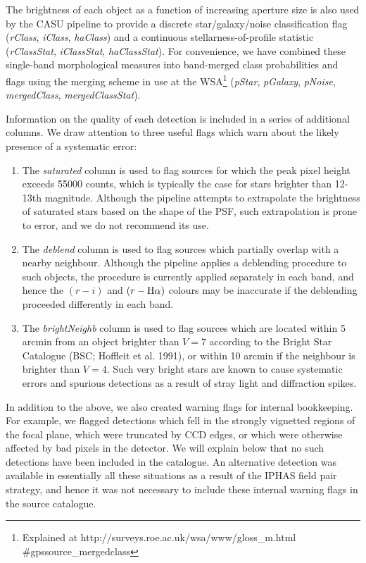 \documentclass[useAMS,usenatbib]{mn2e}
\def\ha{\mbox{H$\rm \alpha$}}
\begin{document}
The brightness of each object as a function of increasing
aperture size is also used by the CASU pipeline to provide
a discrete star/galaxy/noise classification flag
(\emph{rClass}, \emph{iClass}, \emph{haClass})
and a continuous stellarness-of-profile statistic
(\emph{rClassStat}, \emph{iClassStat}, \emph{haClassStat}).
For convenience, we have combined
these single-band morphological measures
into band-merged class probabilities and flags
using the merging scheme in use at the WSA\footnote{Explained at
http://surveys.roe.ac.uk/wsa/www/gloss\_m.html \#gpssource\_mergedclass
} (\emph{pStar}, \emph{pGalaxy}, \emph{pNoise},
\emph{mergedClass}, \emph{mergedClassStat}).


Information on the quality of each detection is included 
in a series of additional columns.
We draw attention to three useful flags
which warn about the likely presence of a systematic error:
\begin{enumerate}
\item The \emph{saturated} column is used to flag sources
for which the peak pixel height exceeds 55000 counts,
which is typically the case for stars brighter than 12-13th magnitude.
Although the pipeline attempts to extrapolate the brightness of
saturated stars based on the shape of the PSF,
such extrapolation is prone to error,
and we do not recommend its use.
\item The \emph{deblend} column is used to flag sources 
which partially overlap with a nearby neighbour.
Although the pipeline applies a deblending procedure
to such objects, the procedure is currently applied separately
in each band, and hence the $(r-i)$ and $(r-\ha)$ colours
may be inaccurate if the deblending proceeded differently in each band.
\item The \emph{brightNeighb} column is used to flag sources which are located
within 5 arcmin from an object brighter than $V=7$ 
according to the Bright Star Catalogue (BSC; Hoffleit et al. 1991), 
or within 10 arcmin if the neighbour is brighter than $V=4$.
Such very bright stars are known to cause systematic errors
and spurious detections as a result of stray light 
and diffraction spikes.
\end{enumerate}
In addition to the above, we also created warning flags for internal bookkeeping.
For example, we flagged detections which fell in the strongly vignetted regions of the focal plane,
which were truncated by CCD edges,
or which were otherwise affected by bad pixels in the detector.
We will explain below that no such detections 
have been included in the catalogue.
An alternative detection was available in essentially all these situations
as a result of the IPHAS field pair strategy,
and hence it was not necessary to include these internal warning flags
in the source catalogue.
\end{document}
